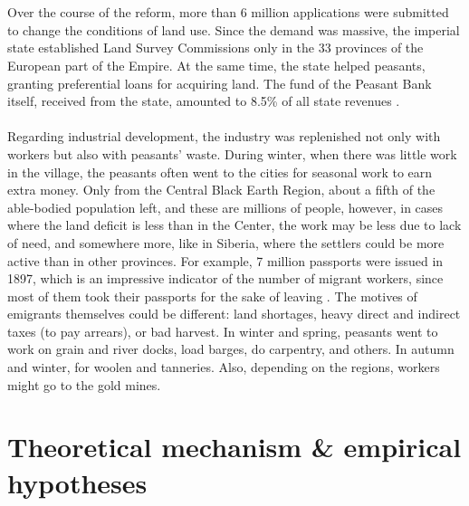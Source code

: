 \documentclass[a4paper, 12pt]{article}
\begin{document}
\\\\
Over the course of the reform, more than 6 million applications were submitted to change the conditions of land use. Since the demand was massive, the imperial state established Land Survey Commissions only in the 33 provinces  of the European part of the Empire. At the same time, the state helped peasants, granting preferential loans for acquiring land.  The fund of the Peasant Bank itself, received from the state, amounted to 8.5\% of all state revenues \parencite{davydov}.
\\\\
Regarding industrial development, the industry was replenished not only with workers but also with peasants' waste. During winter, when there was little work in the village, the peasants often went to the cities for seasonal work to earn extra money. Only from the Central Black Earth Region, about a fifth of the able-bodied population left, and these are millions of people, however, in cases where the land deficit is less than in the Center, the work may be less due to lack of need, and somewhere more, like in Siberia, where the settlers could be more active than in other provinces\parencite{davydov}. For example, 7 million passports were issued in 1897, which is an impressive indicator of the number of migrant workers, since most of them took their passports for the sake of leaving \parencite{laktykina}. The motives of emigrants themselves could be different: land shortages, heavy direct and indirect taxes (to pay arrears), or bad harvest. In winter and spring, peasants went to work on grain and river docks, load barges, do carpentry, and others. In autumn and winter, for woolen and tanneries. Also, depending on the regions, workers might go to the gold mines.



    
\section{Theoretical mechanism \& empirical hypotheses}    
    
\end{document}
